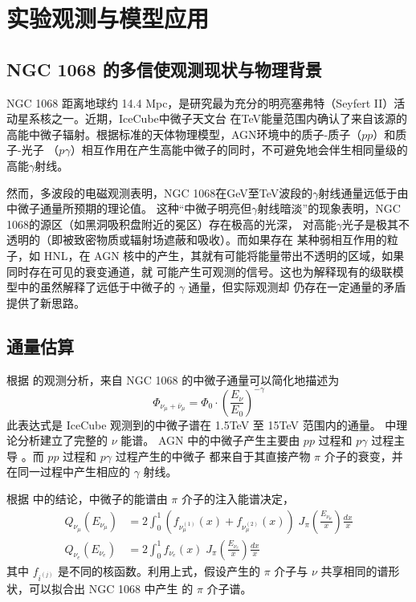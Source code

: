 \documentclass[printMode=false, declarePage=false]{ecnuthesis}
\begin{document}
\chapter{实验观测与模型应用}

\section{NGC 1068 的多信使观测现状与物理背景}

NGC 1068 距离地球约 14.4 Mpc，是研究最为充分的明亮塞弗特（Seyfert II）活动星系核之一。近期，IceCube中微子天文台
在TeV能量范围内确认了来自该源的高能中微子辐射。根据标准的天体物理模型，AGN环境中的质子-质子（$pp$）和质子-光子
（$p\gamma$）相互作用在产生高能中微子的同时，不可避免地会伴生相同量级的高能$\gamma$射线。

然而，多波段的电磁观测表明，NGC 1068在GeV至TeV波段的$\gamma$射线通量远低于由中微子通量所预期的理论值。
这种“中微子明亮但$\gamma$射线暗淡”的现象表明，NGC 1068的源区（如黑洞吸积盘附近的冕区）存在极高的光深，
对高能$\gamma$光子是极其不透明的（即被致密物质或辐射场遮蔽和吸收）\cite{murase2020hidden}。而如果存在
某种弱相互作用的粒子，如 HNL，在 AGN 核中的产生，其就有可能将能量带出不透明的区域，如果同时存在可见的衰变通道，就
可能产生可观测的信号。这也为解释现有的级联模型中的虽然解释了远低于中微子的 $\gamma$ 通量，但实际观测却
仍存在一定通量的矛盾提供了新思路。

\section{通量估算}

根据 \parencite{icecube2022evidence} 的观测分析，来自 NGC 1068 的中微子通量可以简化地描述为
\begin{equation}
  \Phi_{\nu_\mu + \bar{\nu}_\mu} = \Phi_0 \cdot (\frac{E_\nu}{E_0})^{-\gamma} \label{eq:icecube_nuspec}
\end{equation}
此表达式是 IceCube 观测到的中微子谱在 1.5TeV 至 15TeV 范围内的通量。\parencite{murase2020hidden} 中理论分析建立了完整的 $\nu$ 能谱。
AGN 中的中微子产生主要由 $pp$ 过程和 $p\gamma$ 过程主导 \cite{murase2020hidden}。而 $pp$ 过程和 $p\gamma$ 过程产生的中微子
都来自于其直接产物 $\pi$ 介子的衰变，并在同一过程中产生相应的 $\gamma$ 射线。

根据 \parencite{kelner2006energy} 中的结论，中微子的能谱由 $\pi$ 介子的注入能谱决定，
\begin{align}
  Q_{\nu_\mu}(E_{\nu_\mu}) & = 2 \int_{0}^{1} (f_{\nu_\mu^{(1)}}(x) + f_{\nu_\mu^{(2)}}(x)) \; J_\pi\left(\frac{E_{\nu_\mu}}{x}\right) \frac{dx}{x} \\
  Q_{\nu_e}(E_{\nu_e})     & = 2 \int_{0}^{1} f_{\nu_e}(x) \; J_\pi\left(\frac{E_{\nu_e}}{x}\right) \frac{dx}{x}
\end{align}
其中 $f_{i^{(j)}}$ 是不同的核函数。利用上式，假设产生的 $\pi$ 介子与 $\nu$ 共享相同的谱形状，可以拟合出 NGC 1068 中产生
的 $\pi$ 介子谱。
\end{document}
